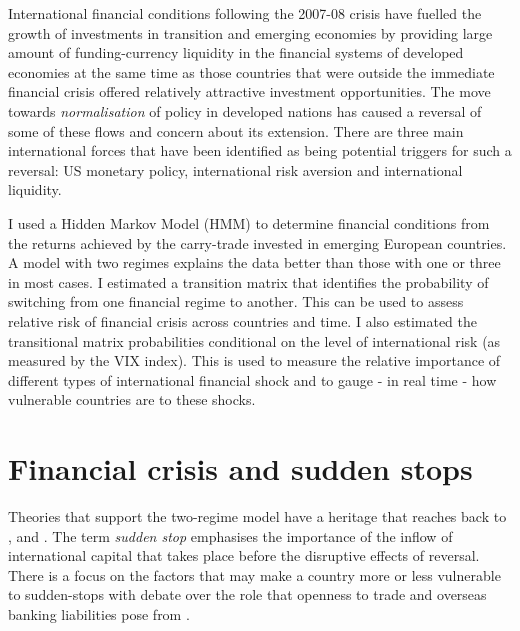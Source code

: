 \documentclass[12pt, a4paper, oneside]{article}\usepackage[]{graphicx}\usepackage[]{color}
\begin{document}

International financial conditions following the 2007-08 crisis have fuelled the growth of investments in transition and emerging economies by providing large amount of funding-currency liquidity in the financial systems of developed economies at the same time as those countries that were outside the immediate financial crisis offered relatively attractive investment opportunities.   The move towards \emph{normalisation} of policy in developed nations has caused a reversal of some of these flows and concern about its extension.  There are three main international forces that have been identified as being potential triggers for such a reversal:  US monetary policy, international risk aversion and international liquidity. 

I used a Hidden Markov Model (HMM) to determine financial conditions from the returns achieved by the carry-trade invested in emerging European countries. A model with two regimes explains the data better than those with one or three in most cases.  I estimated a transition matrix that identifies the probability of switching from one financial regime to another. This can be used to assess relative risk of financial crisis across countries and time.  I also estimated the transitional matrix probabilities conditional on the level of international risk (as measured by the VIX index).  This is used to measure the relative importance of different types of international financial shock and to gauge - in real time - how vulnerable countries are to these shocks. %

\section{Financial crisis and sudden stops}
Theories that support the two-regime model have a heritage that reaches back to \citet{DornbuschSS}, \citet{CalvoSS} and \citet{KrugmanSS}.  The term \emph{sudden stop} emphasises the importance of the inflow of international capital that takes place before the disruptive effects of reversal.  There is a focus on the factors that may make a country more or less vulnerable to sudden-stops with debate over the role that openness to trade \citet{Cavallo20081430} and overseas banking liabilities pose from \citet{calvo2004empiric}.   
 
\end{document}

